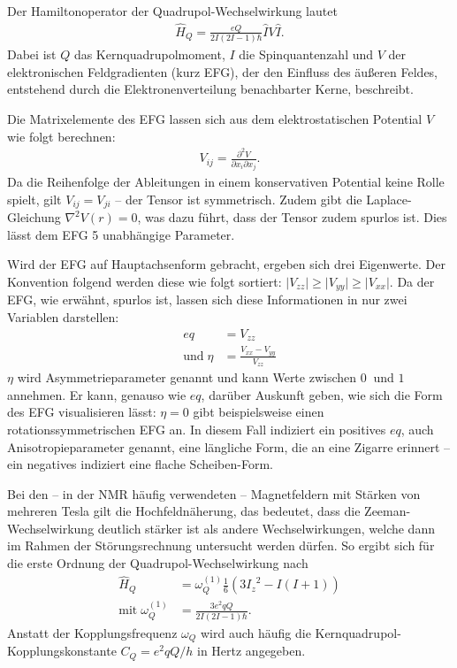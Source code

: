 Der Hamiltonoperator der Quadrupol-Wechselwirkung lautet \cite[S. 208]{levitt}
\begin{align}
	\hat{H}_Q = \frac{eQ}{2I (2I - 1) \hbar} \hat{I} V \hat{I}.
\end{align}
Dabei ist $Q$ das Kernquadrupolmoment, $I$ die Spinquantenzahl und $V$ der elektronischen Feldgradienten (kurz EFG), der den Einfluss des äußeren Feldes, entstehend durch die Elektronenverteilung benachbarter Kerne, beschreibt.

Die Matrixelemente des EFG lassen sich aus dem elektrostatischen Potential $V$ wie folgt berechnen:
\begin{align}
	V_{ij} = \frac{\partial^2 V}{\partial x_i \partial x_j}.
\end{align}
Da die Reihenfolge der Ableitungen in einem konservativen Potential keine Rolle spielt, gilt $V_{ij} = V_{ji}$ -- der Tensor ist symmetrisch. Zudem gibt die Laplace-Gleichung $\nabla^2 V(r) = 0$, was dazu führt, dass der Tensor zudem spurlos ist. Dies lässt dem EFG 5 unabhängige Parameter.

Wird der EFG auf Hauptachsenform gebracht, ergeben sich drei Eigenwerte. Der Konvention folgend werden diese wie folgt sortiert: $\lvert V_{zz} \rvert \ge \lvert V_{yy} \rvert \ge \lvert V_{xx} \rvert$. Da der EFG, wie erwähnt, spurlos ist, lassen sich diese Informationen in nur zwei Variablen darstellen:
\begin{align}
	eq                & = V_{zz}                         \\
	\text{und}\; \eta & = \frac{V_{xx} - V_{yy}}{V_{zz}}
\end{align}
$\eta$ wird Asymmetrieparameter genannt und kann Werte zwischen $\SI{0}{}$ und $\SI{1}{}$ annehmen. Er kann, genauso wie $eq$, darüber Auskunft geben, wie sich die Form des EFG visualisieren lässt: $\eta = 0$ gibt beispielsweise einen rotationssymmetrischen EFG an. In diesem Fall indiziert ein positives $eq$, auch Anisotropieparameter genannt, eine längliche Form, die an eine Zigarre erinnert -- ein negatives indiziert eine flache Scheiben-Form.

Bei den -- in der NMR häufig verwendeten -- Magnetfeldern mit Stärken von mehreren Tesla gilt die Hochfeldnäherung, das bedeutet, dass die Zeeman-Wechselwirkung deutlich stärker ist als andere Wechselwirkungen, welche dann im Rahmen der Störungsrechnung untersucht werden dürfen. So ergibt sich für die erste Ordnung der Quadrupol-Wechselwirkung nach \cite[S. 209]{levitt}
\begin{align}
	\hat{H}_Q                   & = \omega_Q^{(1)} \frac{1}{6} \left( 3 {I_z}^2 - I(I + 1) \right) \\
	\text{mit}\; \omega_Q^{(1)} & = \frac{3e^2qQ}{2I(2I - 1) \hbar}.
\end{align}
Anstatt der Kopplungsfrequenz $\omega_Q$ wird auch häufig die Kern\-quad\-ru\-pol-Kopp\-lungs\-kon\-stan\-te $C_Q = e^2qQ / h$ in Hertz angegeben.

